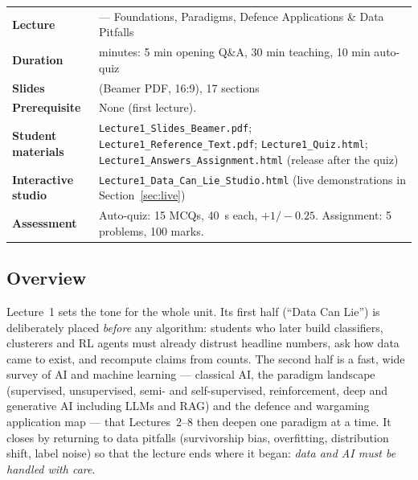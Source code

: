 \documentclass[11pt]{article}
\begin{document}
\begin{center}\small\renewcommand{\arraystretch}{1.25}\begin{tabularx}{\textwidth}{@{}>{\bfseries}p{3.3cm}>{\raggedright\arraybackslash}X@{}}\toprule

\textcolor{NavyN}{Lecture}&1 --- Foundations, Paradigms, Defence Applications \& Data Pitfalls\\
\textcolor{NavyN}{Duration}&45 minutes: 5 min opening Q\&A, 30 min teaching, 10 min auto-quiz\\
\textcolor{NavyN}{Slides}&54 (Beamer PDF, 16:9), 17 sections\\
\textcolor{NavyN}{Prerequisite}&None (first lecture).\\
\textcolor{NavyN}{Student materials}&\texttt{Lecture1\_Slides\_Beamer.pdf}; \texttt{Lecture1\_Reference\_Text.pdf}; \texttt{Lecture1\_Quiz.html}; \texttt{Lecture1\_Answers\_Assignment.html} (release after the quiz)\\
\textcolor{NavyN}{Interactive studio}&\texttt{Lecture1\_Data\_Can\_Lie\_Studio.html} (live demonstrations in Section~\ref{sec:live})\\
\textcolor{NavyN}{Assessment}&Auto-quiz: 15 MCQs, 40~s each, $+1/-0.25$. Assignment: 5 problems, 100 marks.\\\bottomrule\end{tabularx}\end{center}

\subsection*{Overview}Lecture~1 sets the tone for the whole unit. Its first half (``Data Can Lie'') is deliberately placed \emph{before} any algorithm: students who later build classifiers, clusterers and RL agents must already distrust headline numbers, ask how data came to exist, and recompute claims from counts. The second half is a fast, wide survey of AI and machine learning --- classical AI, the paradigm landscape (supervised, unsupervised, semi- and self-supervised, reinforcement, deep and generative AI including LLMs and RAG) and the defence and wargaming application map --- that Lectures~2--8 then deepen one paradigm at a time. It closes by returning to data pitfalls (survivorship bias, overfitting, distribution shift, label noise) so that the lecture ends where it began: \emph{data and AI must be handled with care}.
\end{document}
